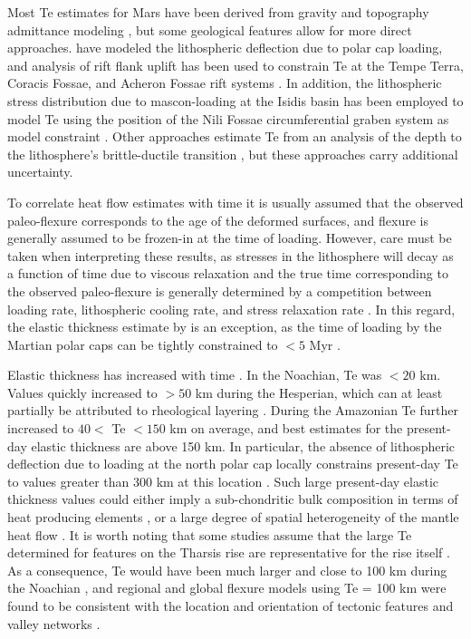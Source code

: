 Most Te estimates for Mars have been derived from gravity and topography admittance modeling \citep{McGovern2004, Kiefer2004, Belleguic2005, Hoogenboom2006, Wieczorek2008, Grott2012}, but some geological features allow for more direct approaches. \citet{Phillips2008} have modeled the lithospheric deflection due to polar cap loading, and analysis of rift flank uplift has been used to constrain Te at the Tempe Terra, Coracis Fossae, and Acheron Fossae rift systems \citep{Barnett2002, Grott2005, Kronberg2007}. In addition, the lithospheric stress distribution due to mascon-loading at the Isidis basin has been employed to model Te using the position of the Nili Fossae circumferential graben system as model constraint \citep{Comer1985, Ritzer2009}. Other approaches estimate Te from an analysis of the depth to the lithosphere’s brittle-ductile transition \citep{Schultz2001, Grott2007, Ruiz2009,MUELLER2014100, Egea-Gonzalez2017}, but these approaches carry additional uncertainty. 

To correlate heat flow estimates with time it is usually assumed that the observed paleo-flexure corresponds to the age of the deformed surfaces, and flexure is generally assumed to be frozen-in at the time of loading. However, care must be taken when interpreting these results, as stresses in the lithosphere will decay as a function of time due to viscous relaxation and the true time corresponding to the observed paleo-flexure is generally determined by a competition between loading rate, lithospheric cooling rate, and stress relaxation rate \citep{Albert2000, Brown2000}. In this regard, the elastic thickness estimate by \citet{Phillips2008} is an exception, as the time of loading by the Martian polar caps can be tightly constrained to $<5$ Myr \citep{Phillips2008}.

Elastic thickness has increased with time \citep{GolombekM.P.andPhillips2010,Grott2013,Ruiz2014}. In the Noachian, Te was $< 20$ km. Values quickly increased to $>50$ km during the Hesperian, which can at least partially be attributed to rheological layering \citep{Burov1995, Grott2008, Grott2009}. During the Amazonian Te further increased to $40 <$ Te $< 150$ km on average, and best estimates for the present-day elastic thickness are above 150 km. In particular, the absence of lithospheric deflection due to loading at the north polar cap locally constrains present-day Te to values greater than 300 km at this location \citep{Phillips2008}. Such large present-day elastic thickness values could either imply a sub-chondritic bulk composition in terms of heat producing elements \citep{Phillips2008}, or a large degree of spatial heterogeneity of the mantle heat flow \citep{Phillips2008, Grott2009, Grott2010, Kiefer2009, Plesa2016, Breuer2016}. It is worth noting that some studies assume that the large Te determined for features on the Tharsis rise are representative for the rise itself \citep{Banerdt2000,Phillips2001}. As a consequence, Te would have been much larger and close to 100 km during the Noachian \citep{Zhong2002,Zhong2003}, and regional and global flexure models using Te = 100 km were found to be consistent with the location and orientation of tectonic features \citep{Banerdt2000} and valley networks \citep{Phillips2001}.

